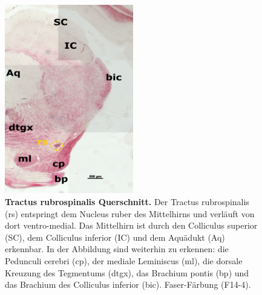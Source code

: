\documentclass[12pt,a4paper,pdftex]{article}
\begin{document}
\begin{figure}[H]
    \centering
    \includegraphics[width=0.5\textwidth]{pictures/Bilder_Laura/rubrospinal_tract_F14_4P_025x.png}
    \caption[Tractus rubrospinalis Querschnitt]{\textbf{Tractus rubrospinalis Querschnitt.} Der Tractus rubrospinalis (rs) entspringt dem Nucleus ruber des Mittelhirns und verläuft von dort ventro-medial. Das Mittelhirn ist durch den Colliculus superior (SC), dem Colliculus inferior (IC) und dem Aquädukt (Aq) erkennbar. In der Abbildung sind weiterhin zu erkennen: die Pedunculi cerebri (cp), der mediale Leminiscus (ml), die dorsale Kreuzung des Tegmentums (dtgx), das Brachium pontis (bp) und das Brachium des Colliculus inferior (bic). Faser-Färbung (F14-4).}
    \label{fig:rubrospinal_tract}
\end{figure}
\end{document}
